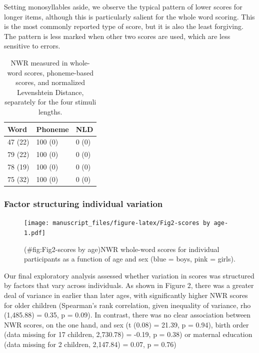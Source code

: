 \documentclass[english,,man,floatsintext]{apa6}
\begin{document}
Setting monosyllables aside, we observe the typical pattern of lower
scores for longer items, although this is particularly salient for the
whole word scoring. This is the most commonly reported type of score,
but it is also the least forgiving. The pattern is less marked when
other two scores are used, which are less sensitive to errors.

\begin{table}[tbp]
\begin{center}
\begin{threeparttable}
\caption{\label{tab:tablength}NWR measured in whole-word scores, phoneme-based scores, and normalized Levenshtein Distance, separately for the four stimuli lengths.}
\begin{tabular}{lll}
\toprule
Word & \multicolumn{1}{c}{Phoneme} & \multicolumn{1}{c}{NLD}\\
\midrule
47 (22) & 100 (0) & 0 (0)\\
79 (22) & 100 (0) & 0 (0)\\
78 (19) & 100 (0) & 0 (0)\\
75 (32) & 100 (0) & 0 (0)\\
\bottomrule
\end{tabular}
\end{threeparttable}
\end{center}
\end{table}

\subsubsection{Factor structuring individual
variation}\label{factor-structuring-individual-variation}

\begin{figure}
\centering
\texttt{[image: manuscript\_files/figure-latex/Fig2-scores by age-1.pdf]}
\caption{(\#fig:Fig2-scores by age)NWR whole-word scores for individual
participants as a function of age and sex (blue = boys, pink = girls).}
\end{figure}

Our final exploratory analysis assessed whether variation in scores was
structured by factors that vary across individuals. As shown in Figure
2, there was a greater deal of variance in earlier than later ages, with
significantly higher NWR scores for older children (Spearman's rank
correlation, given inequality of variance, rho (1,485.88) = 0.35, p =
0.09). In contrast, there was no clear association between NWR scores,
on the one hand, and sex (t (0.08) = 21.39, p = 0.94), birth order (data
missing for 17 children, 2,730.78) = -0.19, p = 0.38) or maternal
education (data missing for 2 children, 2,147.84) = 0.07, p = 0.76)
\end{document}
